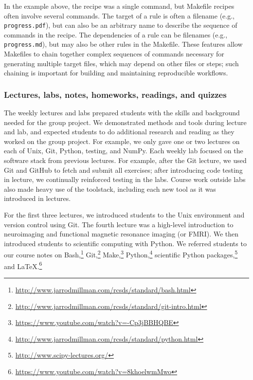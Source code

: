 In the example above, the recipe was a single command, but Makefile recipes
often involve several commands.  The target of a rule is often a filename
(e.g., \texttt{progress.pdf}), but can also be an arbitrary name to describe
the sequence of commands in the recipe.  The dependencies of a rule can be
filenames (e.g., \texttt{progress.md}), but may also be other rules in the
Makefile.  These features allow Makefiles to chain together complex sequences
of commands necessary for generating multiple target files, which may depend on
other files or steps; such chaining is important for building and maintaining
reproducible workflows.

\subsubsection{Lectures, labs, notes, homeworks, readings, and quizzes}

The weekly lectures and labs prepared students with the skills and
background needed for the group project.
We demonstrated methods and tools during lecture and lab,
and expected students to do additional research and reading as they worked on
the group project.
For example, we only gave one or two lectures on each of Unix, Git, Python,
testing, and NumPy.
Each weekly lab focused on the software stack from previous lectures.
For example, after the Git lecture, we used Git and GitHub to fetch and submit
all exercises;
after introducing code testing in lecture, we continually reinforced testing in
the labs.
Course work outside labs also made heavy use of the toolstack, including each
new tool as it was introduced in lectures.

For the first three lectures, we introduced students to the Unix environment
and version control using Git.
The fourth lecture was a high-level introduction to neuroimaging and
functional magnetic resonance imaging (or FMRI).
We then introduced students to scientific computing with Python.
We referred students to our course notes on
Bash,\footnote{\url{http://www.jarrodmillman.com/rcsds/standard/bash.html}}
Git,\footnote{\url{http://www.jarrodmillman.com/rcsds/standard/git-intro.html}}
Make,\footnote{\url{https://www.youtube.com/watch?v=-Cp3jBBHQBE}}
Python,\footnote{\url{http://www.jarrodmillman.com/rcsds/standard/python.html}}
scientific Python packages,\footnote{\url{http://www.scipy-lectures.org/}}
and \LaTeX.\footnote{\url{https://www.youtube.com/watch?v=8khoelwmMwo}}

